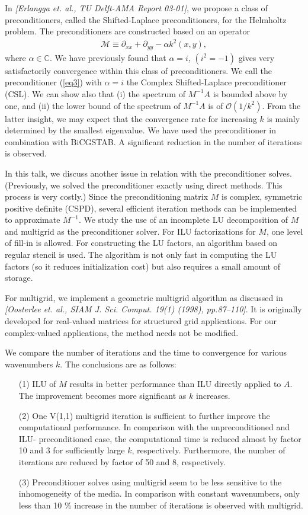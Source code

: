 \documentclass{report}
\begin{document}
In {\it [Erlangga et. al., TU Delft-AMA Report 03-01]}, we propose a
class of preconditioners, called the Shifted-Laplace preconditioners, for
the Helmholtz problem. The preconditioners are constructed based on an
operator
\begin{eqnarray}
\mathcal{M} \equiv \partial_{xx} + \partial_{yy} - \alpha k^2(x,y), \label{eq3}
\end{eqnarray}
where $\alpha \in \mathbb{C}$. We have previously found that $\alpha =
i$, $(i^2 = -1)$ gives very satisfactorily convergence within this class
of preconditioners. We call the preconditioner (\ref{eq3}) with $\alpha =
i$ the Complex Shifted-Laplace preconditioner (CSL). We can show also
that (i) the spectrum of $M^{-1}A$ is bounded above by one, and (ii) the
lower bound of the spectrum of $M^{-1}A$ is of $\mathcal{O}(1/k^2)$. From
the latter insight, we may expect that the convergence rate for
increasing $k$ is mainly determined by the smallest eigenvalue. We have
used the preconditioner in combination with BiCGSTAB. A significant
reduction in the number of iterations is observed.

In this talk, we discuss another issue in relation with the
preconditioner solves. (Previously, we solved the preconditioner exactly
using direct methods. This process is very costly.) Since the
preconditioning matrix $M$ is complex, symmetric positive definite
(CSPD), several efficient iteration methods can be implemented to
approximate $M^{-1}$. We study the use of an incomplete LU decomposition
of $M$ and multigrid as the preconditioner solver. For ILU factorizations
for $M$, one level of fill-in is allowed. For constructing the LU
factors, an algorithm based on regular stencil is used. The algorithm is
not only fast in computing the LU factors (so it reduces initialization
cost) but also requires a small amount of storage.

For multigrid, we implement a geometric multigrid algorithm as discussed
in {\it [Oosterlee et. al., SIAM J. Sci. Comput. 19(1) (1998),
pp.87--110]}. It is originally developed for real-valued matrices for
structured grid applications. For our complex-valued applications, the
method needs not be modified.

We compare the number of iterations and the time to convergence for
various wavenumbers $k$. The conclusions are as follows:
\begin{itemize}
\item[(1)] ILU of $M$ results in better performance than ILU directly
applied to $A$. The improvement becomes more significant as $k$
increases.
\item[(2)] One V(1,1) multigrid iteration is sufficient to further
improve the computational performance. In comparison with the
unpreconditioned and ILU- preconditioned case, the computational time is
reduced almost by factor 10 and 3 for sufficiently large $k$,
respectively. Furthermore, the number of iterations are reduced by factor
of 50 and 8, respectively.
\item[(3)] Preconditioner solves using multigrid seem to be less
sensitive to the inhomogeneity of the media. In comparison with constant
wavenumbers, only less than 10 \% increase in the number of iterations is
observed with multigrid.
\end{itemize}
\end{document}
